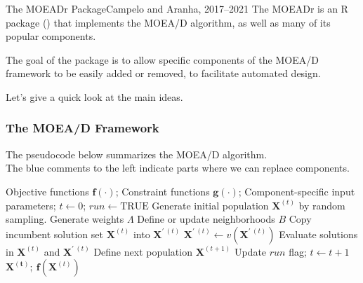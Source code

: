 \documentclass[aspectratio=169]{beamer}
\begin{document}
\begin{frame}{The MOEADr Package}{Campelo and Aranha, 2017--2021}
  The MOEADr is an R package ()
  that implements the MOEA/D algorithm, as well as many of its popular
  components.
  \bigskip

  The goal of the package is to allow specific components of the
  MOEA/D framework to be easily added or removed, to facilitate
  automated design.\bigskip

  Let's give a quick look at the main ideas.
\end{frame}

\begin{frame}
  \frametitle{The MOEA/D Framework}

  \begin{block}{}
    The pseudocode below summarizes the MOEA/D algorithm.\\
    The blue comments to the left indicate parts where we can replace components.
  \end{block}
  
  {\scriptsize
      \begin{algorithmic}[1]
        \Require Objective functions $\mathbf{f}(\cdot)$; Constraint
        functions $\mathbf{g}(\cdot)$;
        \Require Component-specific input parameters;    
        \State $t\leftarrow 0$; $run\leftarrow \mbox{TRUE}$
        \State Generate initial population $\mathbf{X}^{(t)}$ by random sampling.
        \State Generate weights $\Lambda$ 
        \State Define or update neighborhoods $B$
        \State Copy incumbent solution set $\mathbf{X}^{(t)}$ into $\mathbf{X}^{\prime~(t)}$
        \State $\mathbf{X}^{\prime~(t)} \leftarrow v(\mathbf{X}^{\prime~(t)})$
        \EndFor
        \State Evaluate solutions in $\mathbf{X}^{(t)}$ and
        $\mathbf{X}^{\prime~(t)}$ 
        \State Define next population $\mathbf{X}^{(t+1)}$
        \State Update $run$ flag; $t\leftarrow t+1$ 
        \EndWhile
        \vspace{.10cm}
        $\mathbf{X^{(t)}};~\mathbf{f}\left(\mathbf{X}^{(t)}\right)$
      \end{algorithmic}
  }
\end{frame}
\end{document}
